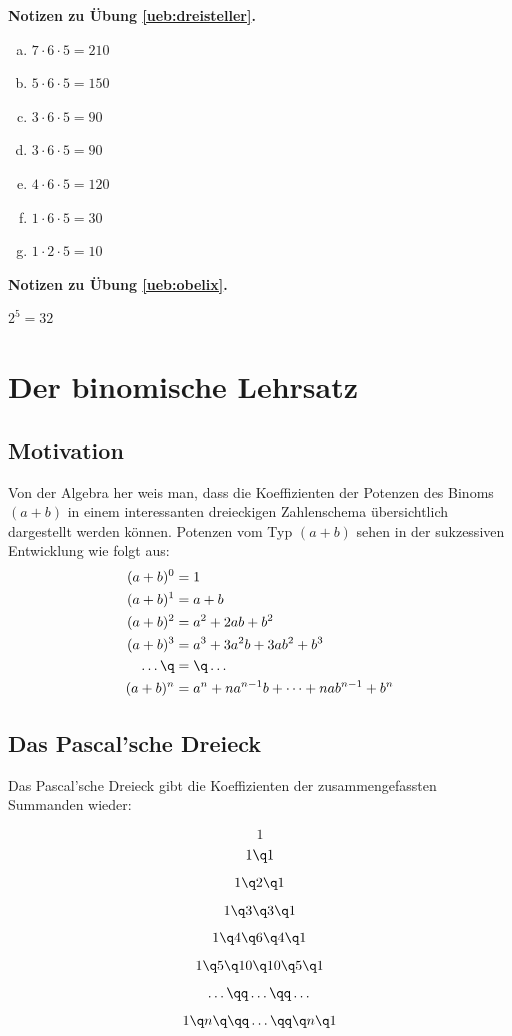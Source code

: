 \documentclass[%
11pt,%
twoside,%
titlepage,%
german,%
headsepline%
]{scrartcl}
\newcommand{\concatueb}[1]{ueb:#1}%
\newcommand{\concatlsg}[1]{lsg:#1}%
\newenvironment{lsg}[1]{%
    \par\noindent\textbf{Notizen zu Übung \ref{\concatueb{#1}}.}%
    \label{\concatlsg{#1}}
}{%
    \par%
}
\begin{document}
\begin{lsg}{dreisteller}
\begin{enumerate}[a)]
\item $7\cdot6\cdot5=210$
\item $5\cdot6\cdot5=150$
\item $3\cdot6\cdot5=90$
\item $3\cdot6\cdot5=90$
\item $4\cdot6\cdot5=120$
\item $1\cdot6\cdot5=30$
\item $1\cdot2\cdot5=10$
\end{enumerate}
\end{lsg}
\begin{lsg}{obelix}
$2^{5}=32$
\end{lsg}

\clearpage

\section{Der binomische Lehrsatz} \label{app:binomial}

\subsection{Motivation}

Von der Algebra her weis man, dass die Koeffizienten der Potenzen des Binoms $(a+b)$ in einem interessanten dreieckigen Zahlenschema übersichtlich dargestellt werden können.
Potenzen vom Typ $(a+b)$ sehen in der sukzessiven Entwicklung wie folgt aus:
\begin{align*}
(a+b)^0&=1\\
(a+b)^1&=a+b\\
(a+b)^2&=a^2+2ab+b^2\\
(a+b)^3&=a^3+3a^2b+3ab^2+b^3\\
\dots\q &= \q\dots\\
(a+b)^n&=a^n+na^{n-1}b+\dots+nab^{n-1}+b^n
\end{align*}

\subsection{Das Pascal'sche Dreieck}

Das Pascal'sche Dreieck gibt die Koeffizienten der zusammengefassten Summanden wieder:\\[-5ex]
\begin{center}
$$1$$
$$1\q1$$
$$1\q2\q1$$
$$1\q3\q3\q1$$
$$1\q4\q6\q4\q1$$
$$1\q5\q10\q10\q5\q1$$
$$\dots\qq\dots\qq\dots$$
$$1\q n\q\qq\dots\qq\q n\q1$$
\end{center}
\end{document}
